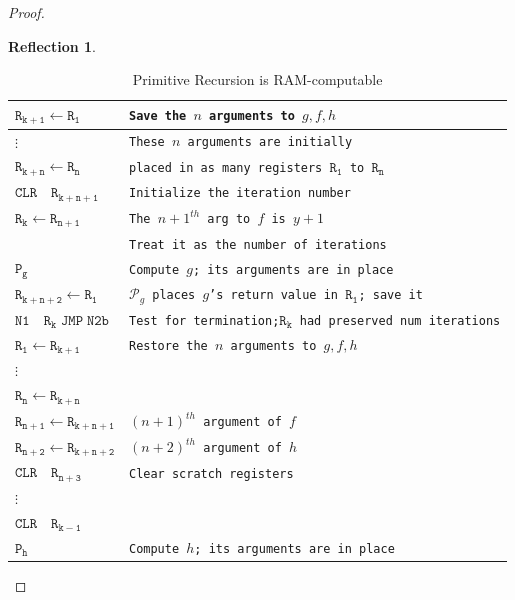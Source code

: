 \documentclass[11pt]{book}
\theoremstyle{definition}
\theoremstyle{plain}
\theoremstyle{problemstyle}
\theoremstyle{remark}
\theoremstyle{definition}
\newtheorem{reflection}{Reflection}
\begin{document}
\begin{proof}
\begin{reflection}
    \end{reflection}


\begin{table}[H]
  \begin{center}
    \caption{Primitive Recursion is RAM-computable}
    \label{tab:primitive-recursion-is-ram-computable}
    \begin{tabular}{|l|l|} 
      \hline
        \qquad$\mathtt{R_{k+1}\leftarrow R_1}$ & \texttt{Save the $n$ arguments to $g,f,h$}\\ \hline
        \qquad$\vdots$&\texttt{These $n$ arguments are initially}\\ \hline
        \qquad$\mathtt{R_{k+n}\leftarrow R_n}$&\texttt{placed in as many registers $\mathtt{R_1}$ to $\mathtt{R_n}$}\\ \hline
        \qquad$\mathtt{CLR\quad R_{k+n+1}}$&\texttt{Initialize the iteration number}\\ \hline
        \qquad$\mathtt{R_k\leftarrow R_{n+1}}$&\texttt{The $n+1^{th}$ arg to $f$ is $y+1$}\\ \hline
        \qquad&\texttt{Treat it as the number of iterations}\\ \hline
        \qquad$\mathtt{P_g}$&\texttt{Compute $g$; its arguments are in place}\\ \hline
        \qquad$\mathtt{R_{k+n+2}\leftarrow R_1}$&\texttt{$\mathcal{P}_g$ places $g$'s return value in $\mathtt{R_1}$; save it}\\ \hline
        $\mathtt{N1\quad R_k\;JMP\;N2b}$&\texttt{Test for termination;$\mathtt{R_k}$ had preserved num iterations}\\ \hline
        \qquad$\mathtt{R_1\leftarrow R_{k+1}}$ & \texttt{Restore the $n$ arguments to $g,f,h$}\\ \hline
        \qquad$\vdots$&\\ \hline
        \qquad$\mathtt{R_n\leftarrow R_{k+n}}$&\\ \hline
        \qquad$\mathtt{R_{n+1}\leftarrow R_{k+n+1}}$&\texttt{$(n+1)^{th}$ argument of $f$}\\ \hline
        \qquad$\mathtt{R_{n+2}\leftarrow R_{k+n+2}}$&\texttt{$(n+2)^{th}$ argument of $h$}\\ \hline
        \qquad$\mathtt{CLR\quad R_{n+3}}$&\texttt{Clear scratch registers} \\ \hline
        \qquad$\vdots$&\\ \hline
        \qquad$\mathtt{CLR\quad R_{k-1}}$& \\ \hline
        \qquad$\mathtt{P_h}$&\texttt{Compute $h$; its arguments are in place}\\ \hline

\end{tabular}
\end{center}
\end{table}
\end{proof}
\end{document}
